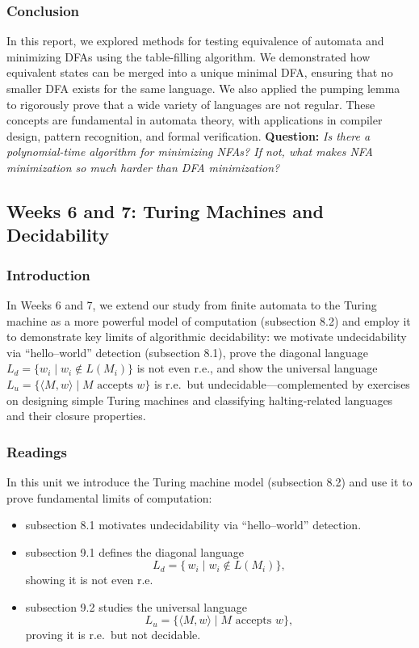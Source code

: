 \documentclass{article}
\theoremstyle{theorem}
\theoremstyle{definition}
\theoremstyle{remark}
\begin{document}
\subsubsection{Conclusion}
In this report, we explored methods for testing equivalence of automata and minimizing DFAs using the table-filling algorithm. We demonstrated how equivalent states can be merged into a unique minimal DFA, ensuring that no smaller DFA exists for the same language. We also applied the pumping lemma to rigorously prove that a wide variety of languages are not regular. These concepts are fundamental in automata theory, with applications in compiler design, pattern recognition, and formal verification.
\textbf{Question:}  
\emph{Is there a polynomial-time algorithm for minimizing NFAs? If not, what makes NFA minimization so much harder than DFA minimization?}

\newpage

\subsection{Weeks 6 and 7: Turing Machines and Decidability}

\subsubsection{Introduction}
In Weeks 6 and 7, we extend our study from finite automata to the Turing machine as a more powerful model of computation (subsection 8.2) and employ it to demonstrate key limits of algorithmic decidability: we motivate undecidability via “hello–world” detection (subsection 8.1), prove the diagonal language \(L_{d}=\{w_i\mid w_i\notin L(M_i)\}\) is not even r.e., and show the universal language \(L_{u}=\{\langle M,w\rangle\mid M\text{ accepts }w\}\) is r.e.\ but undecidable—complemented by exercises on designing simple Turing machines and classifying halting‐related languages and their closure properties.


\subsubsection{Readings}

In this unit we introduce the Turing machine model (subsection 8.2) and use it to prove fundamental limits of computation:  
\begin{itemize}
  \item subsection 8.1 motivates undecidability via “hello–world” detection.  
  \item subsection 9.1 defines the diagonal language 
    \[
      L_{d} = \{\,w_i \mid w_i \notin L(M_i)\},
    \]
    showing it is not even r.e.  
  \item subsection 9.2 studies the universal language 
    \[
      L_{u} = \{\langle M,w\rangle \mid M\text{ accepts }w\},
    \]
    proving it is r.e.\ but not decidable.  
\end{itemize}
\end{document}
